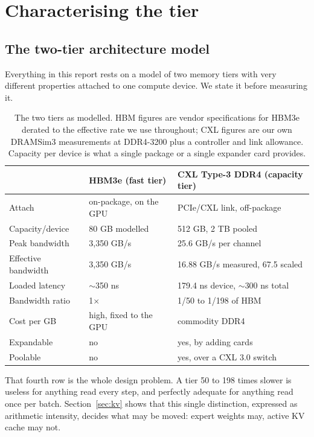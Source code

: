 \documentclass[10pt,a4paper]{article}
\begin{document}
\section{Characterising the tier}
\label{sec:tier}

\subsection{The two-tier architecture model}
\label{sec:archmodel}

Everything in this report rests on a model of two memory tiers with very
different properties attached to one compute device. We state it before
measuring it.

\begin{table}[htbp]
\centering\small
\caption{The two tiers as modelled. HBM figures are vendor specifications for
HBM3e derated to the effective rate we use throughout; CXL figures are our own
DRAMSim3 measurements at DDR4-3200 plus a controller and link allowance.
Capacity per device is what a single package or a single expander card
provides.}
\label{tab:archmodel}
\begin{tabular}{lll}
\toprule
 & HBM3e (fast tier) & CXL Type-3 DDR4 (capacity tier) \\
\midrule
Attach            & on-package, on the GPU  & PCIe/CXL link, off-package \\
Capacity/device   & 80 GB modelled          & 512 GB, 2 TB pooled \\
Peak bandwidth    & 3{,}350 GB/s            & 25.6 GB/s per channel \\
Effective bandwidth & 3{,}350 GB/s          & 16.88 GB/s measured, 67.5 scaled \\
Loaded latency    & $\sim$350 ns            & 179.4 ns device, $\sim$300 ns total \\
Bandwidth ratio   & 1$\times$               & 1/50 to 1/198 of HBM \\
Cost per GB       & high, fixed to the GPU  & commodity DDR4 \\
Expandable        & no                      & yes, by adding cards \\
Poolable          & no                      & yes, over a CXL 3.0 switch \\
\bottomrule
\end{tabular}
\end{table}

That fourth row is the whole design problem. A tier 50 to 198 times
slower is useless for anything read every step, and perfectly adequate for
anything read once per batch. Section~\ref{sec:kv} shows that this single
distinction, expressed as arithmetic intensity, decides what may be moved: expert
weights may, active KV cache may not.
\end{document}

